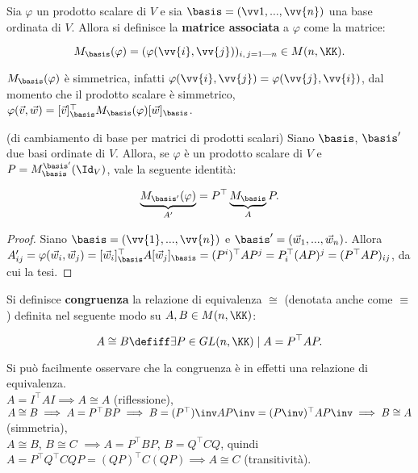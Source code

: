 \documentclass[11pt]{article}
\begin{document}
	\begin{definition}
		Sia $\varphi$ un prodotto scalare di $V$ e sia $\basis = (\vv1, ..., \vv{n})$ una base ordinata di $V$. Allora si definisce la \textbf{matrice associata}
		a $\varphi$ come la matrice:
		
		\[ M_\basis(\varphi) = (\varphi(\vv{i}, \vv{j}))_{i,\,j = 1\text{---}n} \in M(n, \KK). \] 
	\end{definition}

	\begin{remark}\nl
		\li $M_\basis(\varphi)$ è simmetrica, infatti $\varphi(\vv{i}, \vv{j}) = \varphi(\vv{j}, \vv{i})$,
		dal momento che il prodotto scalare è simmetrico, \\
		\li $\varphi(\vec{v}, \vec{w}) = [\vec{v}]_\basis^\top M_\basis(\varphi) [\vec{w}]_\basis$.
	\end{remark}

	\begin{theorem} (di cambiamento di base per matrici di prodotti scalari) Siano $\basis$, $\basis'$ due
		basi ordinate di $V$. Allora, se $\varphi$ è un prodotto scalare di $V$ e $P = M^{\basis'}_{\basis}(\Id_V)$, vale la seguente identità:
		
		\[ \underbrace{M_{\basis'}(\varphi)}_{A'} = P^\top \underbrace{M_{\basis}}_{A} P. \]
	\end{theorem}

	\begin{proof} Siano $\basis = (\vv{1}, ..., \vv{n})$ e $\basis' = (\vec{w}_1, ..., \vec{w}_n)$. Allora
		$A'_{ij} = \varphi(\vec{w}_i, \vec{w}_j) = [\vec{w}_i]_{\basis}^\top A [\vec{w}_j]_{\basis} =
		(P^i)^\top A P^j = P_i^\top (AP)^j = (P^\top AP)_{ij}$, da cui la tesi.
	\end{proof}

	\begin{definition}
		Si definisce \textbf{congruenza} la relazione di equivalenza $\cong$ (denotata anche come $\equiv$) definita nel seguente
		modo su $A, B \in M(n, \KK)$:
		
		\[ A \cong B \defiff \exists P \in GL(n, \KK) \mid A = P^\top A P. \]
	\end{definition}

	\begin{remark}
		Si può facilmente osservare che la congruenza è in effetti una relazione di equivalenza. \\
		
		\li $A = I^\top A I \implies A \cong A$ (riflessione), \\
		\li $A \cong B \implies A = P^\top B P \implies B = (P^\top)\inv A P\inv = (P\inv)^\top A P\inv \implies B \cong A$ (simmetria), \\
		\li $A \cong B$, $B \cong C$ $\implies A = P^\top B P$, $B = Q^\top C Q$, quindi $A = P^\top Q^\top C Q P =
		(QP)^\top C (QP) \implies A \cong C$ (transitività). 
	\end{remark}
\end{document}
